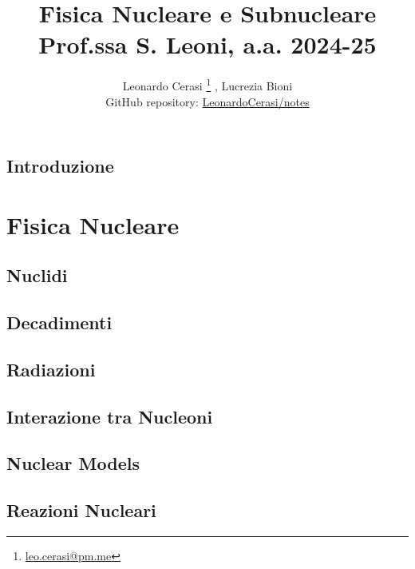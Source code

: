 \documentclass[a4paper, 12pt, openany]{book}
\author{Leonardo Cerasi%
	\thanks{\scriptsize\href{mailto:leonardo.cerasi@studenti.unimi.it}{leo.cerasi@pm.me}}%
	, Lucrezia Bioni\\
	\small GitHub repository: \href{https://github.com/LeonardoCerasi/notes}{LeonardoCerasi/notes}}
\title{\Huge\textbf{Fisica Nucleare e Subnucleare} \\ \large Prof.ssa S. Leoni, a.a. 2024-25}
\begin{document}
\frontmatter

\maketitle

\tableofcontents
\pagestyle{indice}

\mainmatter

\chapter*{Introduzione}
\pagestyle{introd}


\part{Fisica Nucleare}
\pagestyle{body}

\chapter{Nuclidi}
\pagestyle{body}


\chapter{Decadimenti}
\pagestyle{body}


\chapter{Radiazioni}
\pagestyle{body}


\chapter{Interazione tra Nucleoni}
\pagestyle{body}


\chapter{Nuclear Models}
\pagestyle{body}


\chapter{Reazioni Nucleari}
\pagestyle{body}

\end{document}
